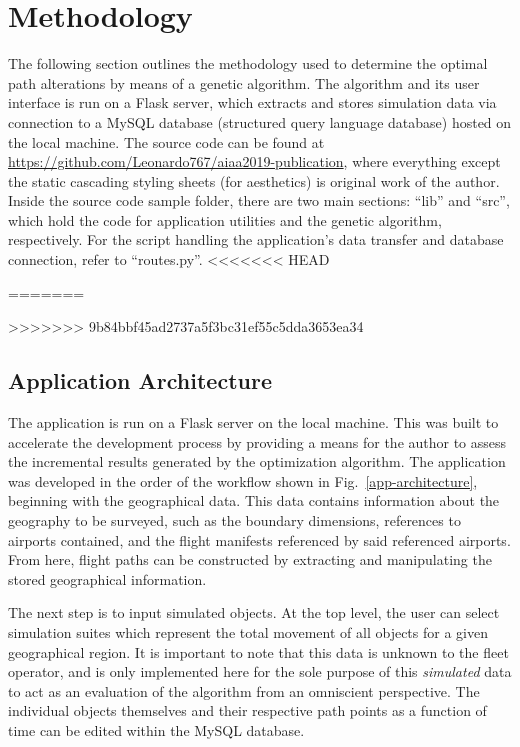 \documentclass[conf]{new-aiaa}
\begin{document}

\section{Methodology}

The following section outlines the methodology used to determine the optimal path alterations by means of a genetic algorithm. The algorithm and its user interface is run on a Flask server, which extracts and stores simulation data via connection to a MySQL database (structured query language database) hosted on the local machine. The source code can be found at \url{https://github.com/Leonardo767/aiaa2019-publication}, where everything except the static cascading styling sheets (for aesthetics) is original work of the author. Inside the source code sample folder, there are two main sections: ``lib'' and ``src'', which hold the code for application utilities and the genetic algorithm, respectively. For the script handling the application's data transfer and database connection, refer to ``routes.py''.
<<<<<<< HEAD


=======


>>>>>>> 9b84bbf45ad2737a5f3bc31ef55c5dda3653ea34
\subsection{Application Architecture}
The application is run on a Flask server on the local machine. This was built to accelerate the development process by providing a means for the author to assess the incremental results generated by the optimization algorithm. The application was developed in the order of the workflow shown in Fig.~\ref{app-architecture}, beginning with the geographical data. This data contains information about the geography to be surveyed, such as the boundary dimensions, references to airports contained, and the  flight manifests referenced by said referenced airports. From here, flight paths can be constructed by extracting and manipulating the stored geographical information.

The next step is to input simulated objects. At the top level, the user can select simulation suites which represent the total movement of all objects for a given geographical region. It is important to note that this data is unknown to the fleet operator, and is only implemented here for the sole purpose of this \emph{simulated} data to act as an evaluation of the algorithm from an omniscient perspective. The individual objects themselves and their respective path points as a function of time can be edited within the MySQL database.
\end{document}
